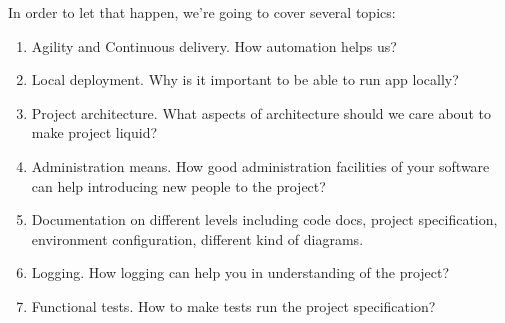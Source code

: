 \documentclass[11pt,a4paper,oneside]{article}
\begin{document}
In order to let that happen, we're going to cover several topics:
\begin{enumerate}
 \item Agility and Continuous delivery. How automation helps us?
 \item Local deployment. Why is it important to be able to run app locally?
 \item Project architecture. What aspects of architecture should we care about to make project liquid?
 \item Administration means. How good administration facilities of your software can help introducing new people to the project?
 \item Documentation on different levels including code docs, project specification, environment configuration, different kind of diagrams.
 \item Logging. How logging can help you in understanding of the project?
 \item Functional tests. How to make tests run the project specification?
\end{enumerate}
\end{document}
